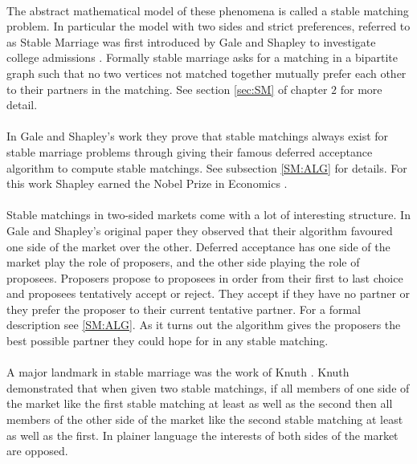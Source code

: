 \paragraph{}
The abstract mathematical model of these phenomena is called a stable matching problem. In particular the model with two sides and strict preferences, referred to as Stable Marriage was first introduced by Gale and Shapley to investigate college admissions \cite{gale1962college}. Formally stable marriage asks for a matching in a bipartite graph such that no two vertices not matched together mutually prefer each other to their partners in the matching. See section \ref{sec:SM} of chapter $2$ for more detail. 

\paragraph{}
In Gale and Shapley's work they prove that stable matchings always exist for stable marriage problems through giving their famous deferred acceptance algorithm to compute stable matchings. See subsection \ref{SM:ALG} for details. For this work Shapley earned the Nobel Prize in Economics \cite{economic2012stable}. 

\paragraph{}
Stable matchings in two-sided markets come with a lot of interesting structure. In Gale and Shapley's original paper \cite{gale1962college} they observed that their algorithm favoured one side of the market over the other. Deferred acceptance has one side of the market play the role of proposers, and the other side playing the role of proposees. Proposers propose to proposees in order from their first to last choice and proposees tentatively accept or reject. They accept if they have no partner or they prefer the proposer to their current tentative partner. For a formal description see \ref{SM:ALG}. As it turns out the algorithm gives the proposers the best possible partner they could hope for in any stable matching. 
 
\paragraph{}
A major landmark in stable marriage was the work of Knuth \cite{knuthmariages}. Knuth demonstrated that when given two stable matchings, if all members of one side of the market like the first stable matching at least as well as the second then all members of the other side of the market like the second stable matching at least as well as the first. In plainer language the interests of both sides of the market are opposed.

